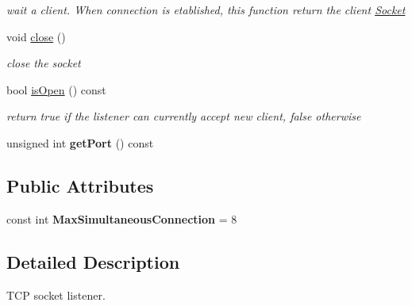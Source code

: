 \begin{DoxyCompactItemize}
\begin{DoxyCompactList}\small\item\em wait a client. When connection is etablished, this function return the client \hyperlink{class_f_t_p_1_1_t_c_p_1_1_socket}{Socket} \end{DoxyCompactList}\item 
\hypertarget{class_f_t_p_1_1_t_c_p_1_1_listener_aeeaa42d5d438dbd156500dffde6caaa2}{void \hyperlink{class_f_t_p_1_1_t_c_p_1_1_listener_aeeaa42d5d438dbd156500dffde6caaa2}{close} ()}\label{class_f_t_p_1_1_t_c_p_1_1_listener_aeeaa42d5d438dbd156500dffde6caaa2}

\begin{DoxyCompactList}\small\item\em close the socket \end{DoxyCompactList}\item 
\hypertarget{class_f_t_p_1_1_t_c_p_1_1_listener_afa96842f3eda508d047553ba09f7be87}{bool \hyperlink{class_f_t_p_1_1_t_c_p_1_1_listener_afa96842f3eda508d047553ba09f7be87}{is\-Open} () const }\label{class_f_t_p_1_1_t_c_p_1_1_listener_afa96842f3eda508d047553ba09f7be87}

\begin{DoxyCompactList}\small\item\em return true if the listener can currently accept new client, false otherwise \end{DoxyCompactList}\item 
\hypertarget{class_f_t_p_1_1_t_c_p_1_1_listener_a068338ce03ae095bfe6f1f6261035886}{unsigned int {\bfseries get\-Port} () const }\label{class_f_t_p_1_1_t_c_p_1_1_listener_a068338ce03ae095bfe6f1f6261035886}

\end{DoxyCompactItemize}
\subsection*{Public Attributes}
\begin{DoxyCompactItemize}
\item 
\hypertarget{class_f_t_p_1_1_t_c_p_1_1_listener_a8989ba42888d474698f599cbec3134df}{const int {\bfseries Max\-Simultaneous\-Connection} = 8}\label{class_f_t_p_1_1_t_c_p_1_1_listener_a8989ba42888d474698f599cbec3134df}

\end{DoxyCompactItemize}


\subsection{Detailed Description}
T\-C\-P socket listener. 

